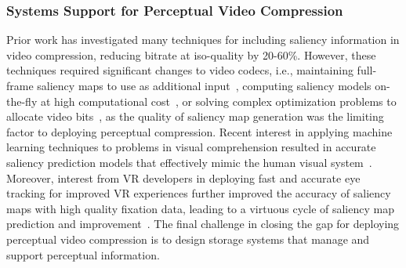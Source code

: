\subsubsection{Systems Support for Perceptual Video Compression} Prior work has investigated many techniques for including saliency information in video compression, reducing bitrate at iso-quality by 20-60\%.
However, these techniques required significant changes to video codecs, i.e., maintaining full-frame saliency maps to use as additional input~\cite{8117038}, computing saliency models on-the-fly at high computational cost~\cite{5223506}, or solving complex optimization problems to allocate video bits~\cite{li2011visual}, as the quality of saliency map generation was the limiting factor to deploying perceptual compression.
Recent interest in applying machine learning techniques to problems in visual comprehension resulted in accurate saliency prediction models that effectively mimic the human visual system~\cite{bylinskii2016saliency}.
Moreover, interest from VR developers in deploying fast and accurate eye tracking for improved VR experiences further improved the accuracy of saliency maps with high quality fixation data, leading to a virtuous cycle of saliency map prediction and improvement~\cite{Whitmire:2016:ESC:2971763.2971771}.
The final challenge in closing the gap for deploying perceptual video compression is to design storage systems that manage and support perceptual information.

